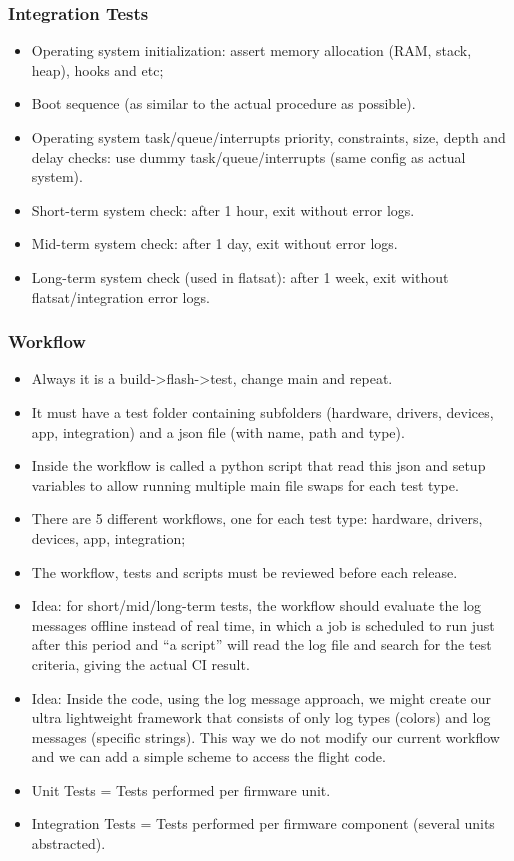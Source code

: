 \subsubsection{Integration Tests}

\begin{itemize}
    \item Operating system initialization: assert memory allocation (RAM, stack, heap), hooks and etc;
    \item Boot sequence (as similar to the actual procedure as possible).
    \item Operating system task/queue/interrupts priority, constraints, size, depth and delay checks: use dummy task/queue/interrupts (same config as actual system).
    \item Short-term system check: after 1 hour, exit without error logs.
    \item Mid-term system check: after 1 day, exit without error logs.
    \item Long-term system check (used in flatsat): after 1 week, exit without flatsat/integration error logs.
\end{itemize}

\subsubsection{Workflow}

\begin{itemize}
    \item Always it is a build->flash->test, change main and repeat.
    \item It must have a test folder containing subfolders (hardware, drivers, devices, app, integration) and a json file (with name, path and type).
    \item Inside the workflow is called a python script that read this json and setup variables to allow running multiple main file swaps for each test type.
    \item There are 5 different workflows, one for each test type: hardware, drivers, devices, app, integration;
    \item The workflow, tests and scripts must be reviewed before each release.
    \item Idea: for short/mid/long-term tests, the workflow should evaluate the log messages offline instead of real time, in which a job is scheduled to run just after this period and ``a script'' will read the log file and search for the test criteria, giving the actual CI result.
    \item Idea: Inside the code, using the log message approach, we might create our ultra lightweight framework that consists of only log types (colors) and log messages (specific strings). This way we do not modify our current workflow and we can add a simple scheme to access the flight code.
    \item Unit Tests = Tests performed per firmware unit.
    \item Integration Tests = Tests performed per firmware component (several units abstracted).
\end{itemize}

